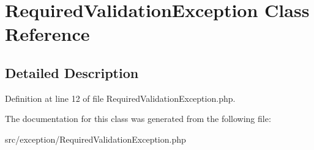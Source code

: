 \hypertarget{classcommon_1_1user_1_1exception_1_1_required_validation_exception}{\section{\-Required\-Validation\-Exception \-Class \-Reference}
\label{classcommon_1_1user_1_1exception_1_1_required_validation_exception}
}


\subsection{\-Detailed \-Description}


\-Definition at line 12 of file \-Required\-Validation\-Exception.\-php.



\-The documentation for this class was generated from the following file\-:\begin{DoxyCompactItemize}
\item 
src/exception/\-Required\-Validation\-Exception.\-php\end{DoxyCompactItemize}

